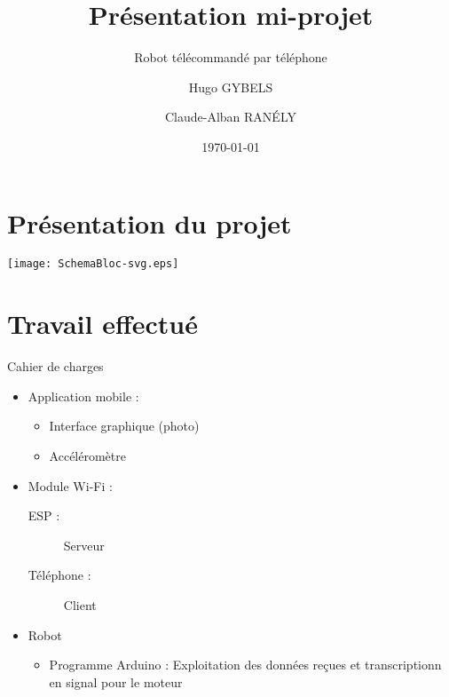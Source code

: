 \documentclass[12pt,unknownkeysallowed]{beamer}
\title{Présentation mi-projet}
\subtitle{Robot télécommandé par téléphone}
\author{Hugo GYBELS \and Claude-Alban RANÉLY}
\date{\today}
\institute{\texttt{[image: MinesTelecom]}}
\begin{document}
\begin{frame}
  \titlepage
\end{frame}


\section{Présentation du projet}

    \begin{frame}{\insertsection}
      \texttt{[image: SchemaBloc-svg.eps]}
    \end{frame}


\section{Travail effectué}

    \begin{frame}{\insertsection}{Cahier de charges}
        \begin{itemize}
            \item Application mobile :
                \begin{itemize}
                    \item Interface graphique (photo)
                    \item Accéléromètre
                \end{itemize}
            \item Module Wi-Fi :
                \begin{description}
                    \item[ESP :] Serveur 
                    \item[Téléphone : ] Client
                \end{description}
            \item Robot
                \begin{itemize}
                    \item Programme Arduino : Exploitation des données reçues et transcriptionn en signal pour le moteur 
                \end{itemize}
        \end{itemize}
    \end{frame}
\end{document}
